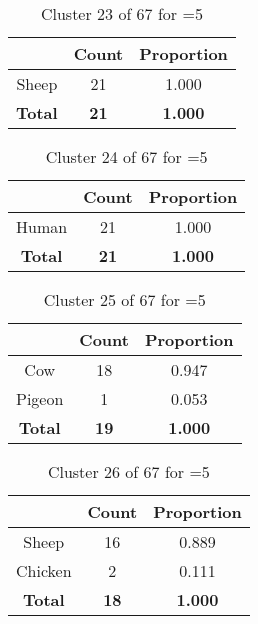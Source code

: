\begin{table}[ht!]
\centering
\begin{tabular}{|c|c|c|}
\hline
\bf \Spec{} &\bf Count &\bf Proportion\\ \hline \hline
Sheep & 21 & 1.000\\ \hline
\hline
\bf Total & \bf 21 & \bf 1.000\\ \hline
\end{tabular}
\label{tab:cluster:23:5}
\caption{Cluster 23 of 67 for \minneigh{}=5}
\end{table}

\begin{table}[ht!]
\centering
\begin{tabular}{|c|c|c|}
\hline
\bf \Spec{} &\bf Count &\bf Proportion\\ \hline \hline
Human & 21 & 1.000\\ \hline
\hline
\bf Total & \bf 21 & \bf 1.000\\ \hline
\end{tabular}
\label{tab:cluster:24:5}
\caption{Cluster 24 of 67 for \minneigh{}=5}
\end{table}

\begin{table}[ht!]
\centering
\begin{tabular}{|c|c|c|}
\hline
\bf \Spec{} &\bf Count &\bf Proportion\\ \hline \hline
Cow & 18 & 0.947\\ \hline
Pigeon & 1 & 0.053\\ \hline
\hline
\bf Total & \bf 19 & \bf 1.000\\ \hline
\end{tabular}
\label{tab:cluster:25:5}
\caption{Cluster 25 of 67 for \minneigh{}=5}
\end{table}

\begin{table}[ht!]
\centering
\begin{tabular}{|c|c|c|}
\hline
\bf \Spec{} &\bf Count &\bf Proportion\\ \hline \hline
Sheep & 16 & 0.889\\ \hline
Chicken & 2 & 0.111\\ \hline
\hline
\bf Total & \bf 18 & \bf 1.000\\ \hline
\end{tabular}
\label{tab:cluster:26:5}
\caption{Cluster 26 of 67 for \minneigh{}=5}
\end{table}

